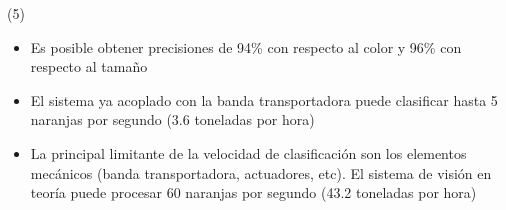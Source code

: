 \begin{frame}{\citetitle{\EntradaBibtex} (5)}
\begin{itemize}
\item Es posible obtener precisiones de 94\% con respecto al color y 96\% con respecto al tamaño 
\item El sistema ya acoplado con la banda transportadora puede clasificar hasta 5 naranjas por segundo (3.6 toneladas por hora)
\item La principal limitante de la velocidad de clasificación son los elementos mecánicos (banda transportadora, actuadores, etc). El sistema de visión en teoría puede procesar 60 naranjas por segundo (43.2 toneladas por hora)
\end{itemize}

\end{frame}


